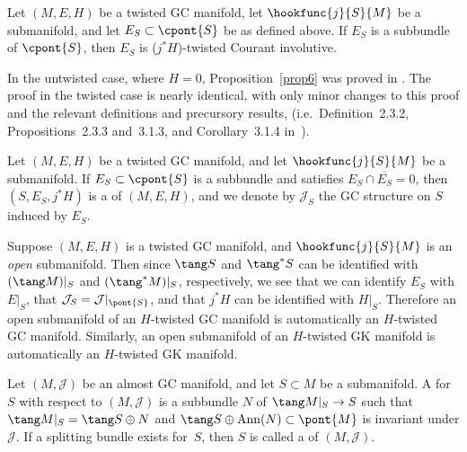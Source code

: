\begin{Proposition} \label{prop6}
Let $(M,E,H)$ be a twisted GC manifold, let $\hookfunc{j}{S}{M}$ be a submanifold, and let $E_S \subset \cpont{S}$ be as defined above.  If $E_S$ is a subbundle of $\cpont{S}$, then $E_S$ is ($j^*H$)-twisted Courant involutive.
\end{Proposition}


In the untwisted case, where $H = 0$, Proposition~\ref{prop6} was proved in \cite[Corollary 3.1.4]{courant}.  The proof in the twisted case is nearly identical, with only minor changes to this proof and the relevant def\/initions and precursory results, (i.e.\ Def\/inition~2.3.2, Propositions~2.3.3 and~3.1.3, and Corollary~3.1.4 in~\cite{courant}).


\begin{Definition}
Let $(M,E,H)$ be a twisted GC manifold, and let $\hookfunc{j}{S}{M}$ be a submanifold.  If $E_S \subset \cpont{S}$ is a subbundle and satisf\/ies $E_S \cap \overline{E_S} = 0$, then $(S,E_S,j^* H)$ is a  of $(M,E,H)$, and we denote by $\mathcal{J}_S$ the GC structure on $S$ induced by $E_S$.
\end{Definition}


\begin{Remark} \label{rem2}
Suppose $(M,E,H)$ is a twisted GC manifold, and $\hookfunc{j}{S}{M}$ is an \emph{open} submanifold.  Then since $\tang S$ and $\tang^* S$ can be identif\/ied with $(\tang M)|_S$ and $(\tang^* M)|_S$, respectively, we see that we can identify $E_S$ with $E|_S$, that $\mathcal{J}_S = \mathcal{J}|_{\pont{S}}$, and that $j^* H$ can be identif\/ied with $H|_S$.  Therefore an open submanifold of an $H$-twisted GC manifold is automatically an $H$-twisted GC manifold.  Similarly, an open submanifold of an $H$-twisted GK manifold is automatically an $H$-twisted GK manifold.
\end{Remark}


\begin{Definition}
Let $(M, \mathcal{J})$ be an almost GC manifold, and let $S \subset M$ be a submanifold.  A  for $S$ with respect to $(M, \mathcal{J})$ is a subbundle $N$ of $\tang M|_S \to S$ such that $\tang M|_S = \tang S \oplus N$ and $\tang S \oplus \operatorname{Ann} (N) \subset \pont{M}$ is invariant under $\mathcal{J}$. If a splitting bundle exists for~$S$, then $S$ is called a  of $(M,\mathcal{J})$.
\end{Definition}


